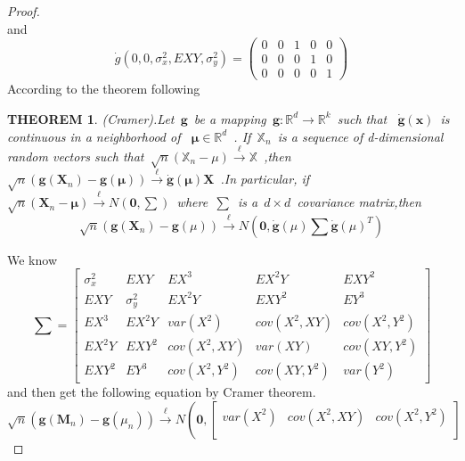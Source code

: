\documentclass{article}
\newtheorem{proof}{PROOF}
\newtheorem{theorem}{THEOREM}
\begin{document}
\begin{proof}
\begin{equation*}
\end{equation*}
and 
\begin{equation*}
\dot{g}(0,0,\sigma_x^2,EXY,\sigma_y^2) = \left(\begin{array}{ccccc}
			0 &0 &1 &0 &0 \\
			0 &0 &0 &1 &0 \\
			0 &0 &0 &0 &1
			\end{array}\right)						
\end{equation*}
According to the theorem following
\begin{theorem}
(Cramer).Let~$\mathbf{g}$~be a mapping~$\mathbf{g}:\mathbb{R}^d\rightarrow\mathbb{R}^k$~such that
~$\dot{\mathbf{g}}(\mathbf{x})$~is continuous in a neighborhood of ~$\mathbf{\mu}\in \mathbb{R}^d$~.
If~$\mathbb{X}_n$~is a sequence of d-dimensional random vectors such that~$\sqrt{n}(\mathbb{X}_n-\mathbb{\mu})\stackrel{\ell}{\longrightarrow}\mathbb{X}$~,then~$\sqrt{n}(\mathbf{g}(\mathbf{X}_n)-\mathbf{g}(\mathbf{\mu}))\stackrel{\ell}{\longrightarrow}\dot{\mathbf{g}}(\mathbf{\mu})\mathbf{X}$~.In particular, if~$\sqrt{n}(\mathbf{X}_n-\mathbf{\mu})\stackrel{\ell}{\longrightarrow}N(\mathbf{0},\mathbf{\sum})$~where~$\mathbf{\sum}$~is a~$d\times d$~covariance matrix,then
\begin{equation*}
\sqrt{n}(\mathbf{g}(\mathbf{X}_n)-\mathbf{g}(\mu))\stackrel{\ell}{\longrightarrow}N(\mathbf{0},\dot{\mathbf{g}}(\mu)\mathbf{\sum}\dot{\mathbf{g}}(\mu)^T)
\end{equation*}
\end{theorem}
We know 
\begin{equation*}
\mathbf{\sum} = 
\begin{bmatrix}
 \sigma_x^2 &EXY        &EX^3         &EX^2Y       &EXY^2 \\ 
 EXY        &\sigma_y^2 &EX^2Y        &EXY^2       &EY^3 \\
 EX^3       &EX^2Y      &var(X^2)     &cov(X^2,XY) &cov(X^2,Y^2) \\
 EX^2Y      &EXY^2      &cov(X^2,XY)  &var(XY)     &cov(XY,Y^2) \\
 EXY^2      &EY^3       &cov(X^2,Y^2) &cov(XY,Y^2) &var(Y^2)   
 \end{bmatrix}
\end{equation*}
and then get the following equation by Cramer theorem.
\begin{equation*}
\sqrt{n}(\mathbf{g}(\mathbf{M}_n)-\mathbf{g}(\mu_n))\stackrel{\ell}{\longrightarrow}N\left(\mathbf{0}, 
			\begin{bmatrix}
			var(X^2)     &cov(X^2,XY) &cov(X^2,Y^2) \\

\end{bmatrix}
\end{equation*}
\end{proof}
\end{document}
